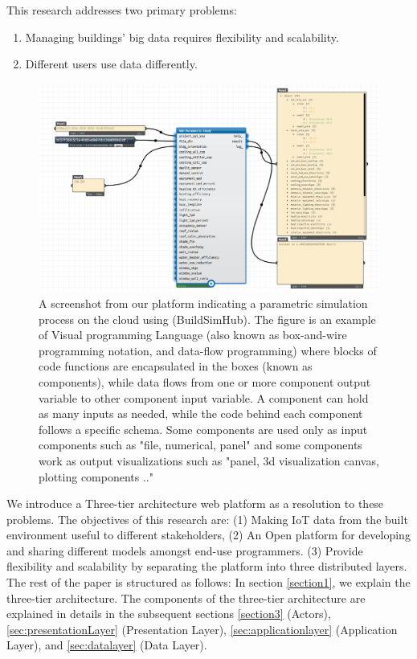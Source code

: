 \documentclass{scsSimAUDPaperFormat}
\begin{document}
This research addresses two primary problems:
\begin{enumerate}
    \item Managing buildings' big data requires flexibility and scalability.
    \item Different users use data differently.
\end{enumerate} 

\begin{figure}
\centering
\includegraphics[width=0.9\columnwidth]{imgs/vpl_example.png}
\caption{A screenshot from our platform indicating a parametric simulation process on the cloud using (BuildSimHub). The figure is an example of Visual programming Language (also known as box-and-wire programming notation, and data-flow programming) where blocks of code functions are encapsulated in the boxes (known as components), while data flows from one or more component output variable to other component input variable. A component can hold as many inputs as needed, while the code behind each component follows a specific schema. Some components are used only as input components such as "file, numerical, panel" and some components work as output visualizations such as "panel, 3d visualization canvas, plotting components .."}
\label{fig:vpl_example}
\end{figure}
We introduce a Three-tier architecture web platform as a resolution to these problems. The objectives of this research are: (1) Making IoT data from the built environment useful to different stakeholders, (2) An Open platform for developing and sharing different models amongst end-use programmers. (3) Provide flexibility and scalability by separating the platform into three distributed layers. The rest of the paper is structured as follows: In section \ref{section1}, we explain the three-tier architecture. The components of the three-tier architecture are explained in details in the subsequent sections \ref{section3} (Actors), \ref{sec:presentationLayer} (Presentation Layer), \ref{sec:applicationlayer} (Application Layer), and \ref{sec:datalayer} (Data Layer).
\end{document}
